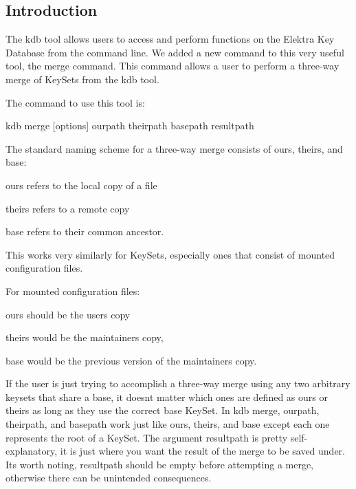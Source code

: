 \subsection*{Introduction}

The kdb tool allows users to access and perform functions on the Elektra Key Database from the command line. We added a new command to this very useful tool, the {\ttfamily merge} command. This command allows a user to perform a three-\/way merge of Key\+Sets from the {\ttfamily kdb} tool.

The command to use this tool is\+:


\begin{DoxyCode}
kdb merge [options] ourpath theirpath basepath resultpath
\end{DoxyCode}


The standard naming scheme for a three-\/way merge consists of {\ttfamily ours}, {\ttfamily theirs}, and {\ttfamily base}\+:


\begin{DoxyItemize}
\item {\ttfamily ours} refers to the local copy of a file
\item {\ttfamily theirs} refers to a remote copy
\item {\ttfamily base} refers to their common ancestor.
\end{DoxyItemize}

This works very similarly for Key\+Sets, especially ones that consist of mounted configuration files.

For mounted configuration files\+:


\begin{DoxyItemize}
\item {\ttfamily ours} should be the user\textquotesingle{}s copy
\item {\ttfamily theirs} would be the maintainers copy,
\item {\ttfamily base} would be the previous version of the maintainer\textquotesingle{}s copy.
\end{DoxyItemize}

If the user is just trying to accomplish a three-\/way merge using any two arbitrary keysets that share a base, it doesn\textquotesingle{}t matter which ones are defined as {\ttfamily ours} or {\ttfamily theirs} as long as they use the correct base Key\+Set. In {\ttfamily kdb merge}, {\ttfamily ourpath}, {\ttfamily theirpath}, and {\ttfamily basepath} work just like {\ttfamily ours}, {\ttfamily theirs}, and {\ttfamily base} except each one represents the root of a Key\+Set. The argument {\ttfamily resultpath} is pretty self-\/explanatory, it is just where you want the result of the merge to be saved under. It\textquotesingle{}s worth noting, {\ttfamily resultpath} should be empty before attempting a merge, otherwise there can be unintended consequences.


